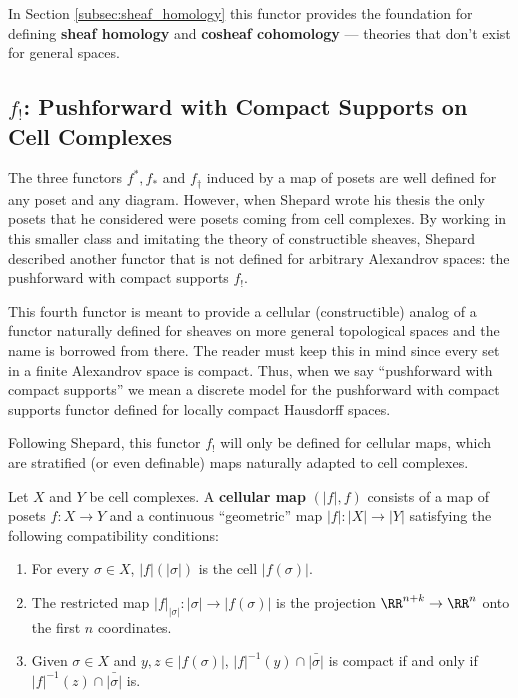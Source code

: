 In Section \ref{subsec:sheaf_homology} this functor provides the foundation for defining \textbf{sheaf homology} and \textbf{cosheaf cohomology} --- theories that don't exist for general spaces.

\subsection{$f_!$: Pushforward with Compact Supports on Cell Complexes}
\label{subsubsec:shriek}

The three functors $f^*,f_*$ and $f_{\dagger}$ induced by a map of posets are well defined for any poset and any diagram. However, when Shepard wrote his thesis the only posets that he considered were posets coming from cell complexes. By working in this smaller class and imitating the theory of constructible sheaves, Shepard described another functor that is not defined for arbitrary Alexandrov spaces: the pushforward with compact supports $f_!$.

This fourth functor is meant to provide a cellular (constructible) analog of a functor naturally defined for sheaves on more general topological spaces and the name is borrowed from there. The reader must keep this in mind since every set in a finite Alexandrov space is compact. Thus, when we say ``pushforward with compact supports'' we mean a discrete model for the pushforward with compact supports functor defined for locally compact Hausdorff spaces.

Following Shepard, this functor $f_!$ will only be defined for cellular maps, which are stratified (or even definable) maps naturally adapted to cell complexes.

\begin{defn}\label{defn:cell_map}
	Let $X$ and $Y$ be cell complexes. A \textbf{cellular map} $(|f|,f)$ consists of a map of posets $f:X\to Y$ and a continuous ``geometric'' map $|f|:|X|\to|Y|$ satisfying the following compatibility conditions:
	\begin{enumerate}
		\item For every $\sigma\in X$, $|f|(|\sigma|)$ is the cell $|f(\sigma)|$.
		\item The restricted map $|f|_{|\sigma|}:|\sigma|\to |f(\sigma)|$ is the projection $\RR^{n+k}\to\RR^n$ onto the first $n$ coordinates.
		\item Given $\sigma\in X$ and $y,z\in |f(\sigma)|$, $|f|^{-1}(y)\cap \bar{|\sigma|}$ is compact if and only if $|f|^{-1}(z)\cap \bar{|\sigma|}$ is.
	\end{enumerate}
\end{defn}

